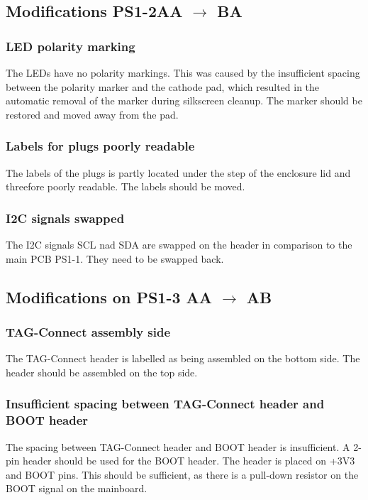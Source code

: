 \subsection{Modifications PS1-2AA $\to$ BA}

\subsubsection{LED polarity marking}
The LEDs have no polarity markings. This was caused by the insufficient spacing between the polarity marker and the cathode pad, which resulted in the automatic removal of the marker during silkscreen cleanup. The marker should be restored and moved away from the pad. 

\subsubsection{Labels for plugs poorly readable}
The labels of the plugs is partly located under the step of the enclosure lid and threefore poorly readable. The labels should be moved. 

\subsubsection{\acs{I2C} signals swapped}
The \ac{I2C} signals SCL nad SDA are swapped on the header in comparison to the main PCB PS1-1. They need to be swapped back. 

\subsection{Modifications on PS1-3 AA $\to$ AB}

\subsubsection{TAG-Connect assembly side}
The TAG-Connect header is labelled as being assembled on the bottom side. The header should be assembled on the top side. 

\subsubsection{Insufficient spacing between TAG-Connect header and BOOT header}
The spacing between TAG-Connect header and BOOT header is insufficient. A 2-pin header should be used for the BOOT header. The header is placed on +3V3 and BOOT pins. This should be sufficient, as there is a pull-down resistor on the BOOT signal on the mainboard. 

